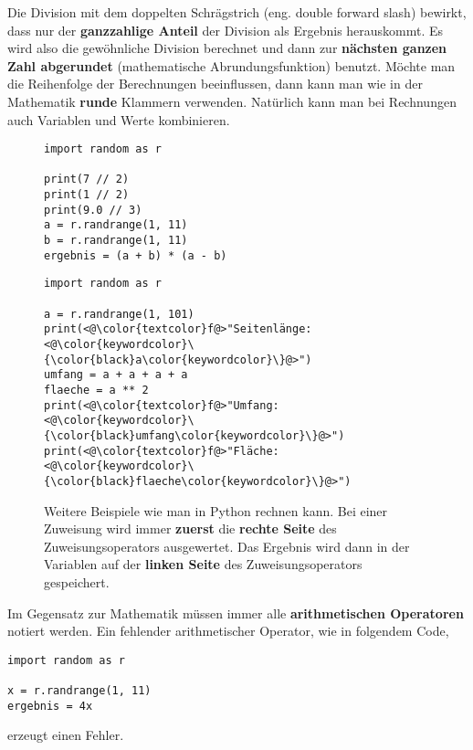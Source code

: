Die Division mit dem doppelten Schrägstrich (eng. double forward slash) bewirkt, dass nur der \textbf{ganzzahlige Anteil} der Division als Ergebnis herauskommt. Es wird also die gewöhnliche Division berechnet und dann zur \textbf{nächsten ganzen Zahl abgerundet} (mathematische Abrundungsfunktion) benutzt. Möchte man die Reihenfolge der Berechnungen beeinflussen, dann kann man wie in der Mathematik \textbf{runde} Klammern verwenden. Natürlich kann man bei Rechnungen auch Variablen und Werte kombinieren.

\begin{figure}[htb]
\centering
\begin{minipage}{0.5\textwidth}
\centering
\begin{lstlisting}
import random as r

print(7 // 2)
print(1 // 2)
print(9.0 // 3)
a = r.randrange(1, 11)
b = r.randrange(1, 11)
ergebnis = (a + b) * (a - b)
\end{lstlisting}
\end{minipage}
\hfill
\begin{minipage}{0.45\textwidth}
\centering
\begin{lstlisting}
import random as r

a = r.randrange(1, 101)
print(<@\color{textcolor}f@>"Seitenlänge: <@\color{keywordcolor}\{\color{black}a\color{keywordcolor}\}@>")
umfang = a + a + a + a
flaeche = a ** 2
print(<@\color{textcolor}f@>"Umfang: <@\color{keywordcolor}\{\color{black}umfang\color{keywordcolor}\}@>")
print(<@\color{textcolor}f@>"Fläche: <@\color{keywordcolor}\{\color{black}flaeche\color{keywordcolor}\}@>")\end{lstlisting}
\end{minipage}
\caption{Weitere Beispiele wie man in Python rechnen kann. Bei einer Zuweisung wird immer \textbf{zuerst} die \textbf{rechte Seite} des Zuweisungsoperators ausgewertet. Das Ergebnis wird dann in der Variablen auf der \textbf{linken Seite} des Zuweisungsoperators gespeichert.}
\label{lst-calc-print-2}
\end{figure}

\begin{important}
	Im Gegensatz zur Mathematik müssen immer alle \textbf{arithmetischen Operatoren} notiert werden. Ein fehlender arithmetischer Operator, wie in folgendem Code,
	
\begin{lstlisting}
import random as r
		
x = r.randrange(1, 11)
ergebnis = 4x
\end{lstlisting}

erzeugt einen Fehler.

\end{important}

